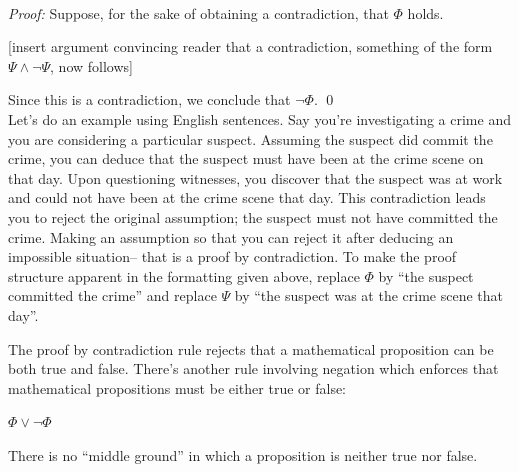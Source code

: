 \documentclass[12pt]{article}
\newcommand{\done}{\\\hspace*{0pt}\hfill$\blacksquare$}
\newcommand{\AND}{\wedge}
\newcommand{\OR}{\vee}
\newcounter{exercise}
\newcounter{rule}
\newcounter{theorem}
\def\putRuleNumber{\refstepcounter{rule}\therule}
\newcommand{\indented}[1]{\begin{adjustwidth}{1em}{}#1\end{adjustwidth}}
\def\thmcolonspace{\hspace{0.2em}}
\def\proofnewline{\\[0.75em]} %
\def\done{\qed\\[0em]} %
\newcommand{\thmbox}[1]{\fbox{\parbox{\textwidth}{{#1}}}}
\newcommand{\THMMOCK}[2]{\thmbox{\textbf{Theorem:} \thmcolonspace #1} \proofnewline \textit{Proof:} #2\done}
\newcommand{\RULE}[2]{\begin{tcolorbox}[title=Rule \putRuleNumber: #1,colbacktitle=white,coltitle=black,colback=white]#2\end{tcolorbox}}
\def\pA{\Phi}
\def\pB{\Psi}
\begin{document}
\THMMOCK{$\neg\pA$.}{
Suppose, for the sake of obtaining a contradiction, that $\pA$ holds.
\indented{[insert argument convincing reader that a contradiction, something of the form $\pB\AND\neg\pB$, now follows]}
Since this is a contradiction, we conclude that $\neg\pA$.
}

Let's do an example using English sentences.
Say you're investigating a crime and you are considering a particular suspect.
Assuming the suspect did commit the crime, you can deduce that the suspect must have been at the crime scene on that day.
Upon questioning witnesses, you discover that the suspect was at work and could not have been at the crime scene that day.
This contradiction leads you to reject the original assumption; the suspect must not have committed the crime.
Making an assumption so that you can reject it after deducing an impossible situation-- that is a proof by contradiction.
To make the proof structure apparent in
the formatting given above, replace
$\pA$ by ``the suspect committed the crime'' and replace $\pB$ by ``the suspect was at the crime scene that day''.


The proof by contradiction rule rejects that a mathematical proposition can be both true and false.
There's
another rule involving negation which
enforces that mathematical propositions must be either true or false:
\RULE{Excluded middle}{
$\pA\OR\neg\pA$
}
There is no ``middle ground'' in which a proposition is neither true nor false.











\end{document}
